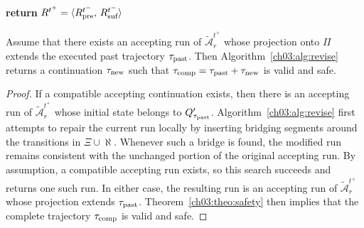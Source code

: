 \begin{algorithm}[t]
\caption{Revise the current plan, \texttt{Revise}()}
\label{ch03:alg:revise}
\DontPrintSemicolon
{}

\textbf{return}
$R^{t^+} = \langle R^{t^-}_{\textup{pre}},\, R^{t^-}_{\textup{suf}} \rangle$\;
\end{algorithm}

\begin{theorem}\label{ch03:theo:new-safe}
Assume that there exists an accepting run of
$\tilde{\mathcal{A}}_{r}^{t^+}$ whose projection onto $\Pi$ extends the
executed past trajectory $\tau_{\textup{past}}$. Then
Algorithm~\ref{ch03:alg:revise} returns a continuation
$\tau_{\textup{new}}$ such that
$\tau_{\textup{comp}} = \tau_{\textup{past}} + \tau_{\textup{new}}$
is valid and safe.
\end{theorem}

\begin{proof}
If a compatible accepting continuation exists, then there is an accepting run
of $\tilde{\mathcal{A}}_{r}^{t^+}$ whose initial state belongs to
$Q'_{\tau_{\textup{past}}}$. Algorithm~\ref{ch03:alg:revise} first attempts to
repair the current run locally by inserting bridging segments around the
transitions in $\Xi \cup \aleph$. Whenever such a bridge is found, the modified
run remains consistent with the unchanged portion of the original accepting
run.
By assumption, a compatible accepting run exists,
so this search succeeds and returns one such run. In either case, the resulting
run is an accepting run of $\tilde{\mathcal{A}}_{r}^{t^+}$ whose projection
extends $\tau_{\textup{past}}$. Theorem~\ref{ch03:theo:safety} then implies
that the complete trajectory $\tau_{\textup{comp}}$ is valid and safe.
\end{proof}

